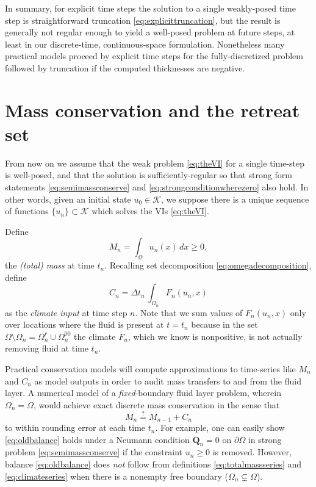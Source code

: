 \documentclass[final,onefignum]{siamart190516}
\newcommand\bQ{\mathbf{Q}}
\begin{document}
In summary, for explicit time steps the solution to a single weakly-posed time step is straightforward truncation \eqref{eq:explicittruncation}, but the result is generally not regular enough to yield a well-posed problem at future steps, at least in our discrete-time, continuous-space formulation.  Nonetheless many practical models \cite[for example]{Winkelmannetal2011} proceed by explicit time steps for the fully-discretized problem followed by truncation if the computed thicknesses are negative.


\section{Mass conservation and the retreat set}  \label{sec:timeseries}

From now on we assume that the weak problem \eqref{eq:theVI} for a single time-step is well-posed, and that the solution is sufficiently-regular so that strong form statements \eqref{eq:semimassconserve} and \eqref{eq:strongconditionwherezero} also hold.  In other words, given an initial state $u_0\in\mathcal{K}$, we suppose there is a unique sequence of functions $\{u_n\} \subset \mathcal{K}$ which solves the VIs \eqref{eq:theVI}.

Define
\begin{equation}
M_n = \int_\Omega u_n(x)\,dx \ge 0, \label{eq:totalmassseries}
\end{equation}
the \emph{(total) mass} at time $t_n$.  Recalling set decomposition \eqref{eq:omegadecomposition}, define
\begin{equation}
C_n = \Delta t_n\, \int_{\Omega_n} F_n(u_n,x) \label{eq:climateseries}
\end{equation}
as the \emph{climate input} at time step $n$.  Note that we sum values of $F_n(u_n,x)$ only over locations where the fluid is present at $t=t_n$ because in the set $\Omega \setminus \Omega_n = \Omega_n^r \cup \Omega_n^{00}$ the climate $F_n$, which we know is nonpositive, is not actually removing fluid at time $t_n$.

Practical conservation models will compute approximations to time-series like $M_n$ and $C_n$ as model outputs in order to audit mass transfers to and from the fluid layer.  A numerical model of a \emph{fixed}-boundary fluid layer problem, wherein $\Omega_n=\Omega$, would achieve exact discrete mass conservation in the sense that
\begin{equation}
M_n \stackrel{?}{=} M_{n-1} + C_n \label{eq:oldbalance}
\end{equation}
to within rounding error at each time $t_n$.  For example, one can easily show \eqref{eq:oldbalance} holds under a Neumann condition $\bQ_n=0$ on $\partial \Omega$ in strong problem \eqref{eq:semimassconserve} if the constraint $u_n\ge 0$ is removed.  However, balance \eqref{eq:oldbalance} does \emph{not} follow from definitions \eqref{eq:totalmassseries} and \eqref{eq:climateseries} when there is a nonempty free boundary ($\Omega_n \subsetneq \Omega$).
\end{document}
